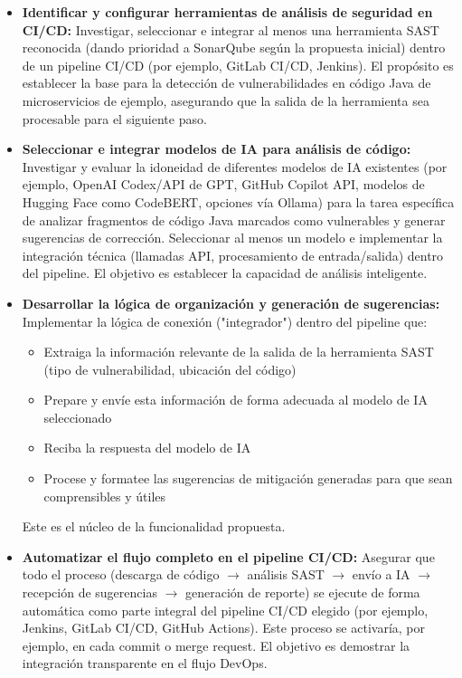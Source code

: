 \begin{itemize}
    \item \textbf{Identificar y configurar herramientas de análisis de seguridad en CI/CD:} Investigar, seleccionar e integrar al menos una herramienta SAST reconocida (dando prioridad a SonarQube según la propuesta inicial) dentro de un pipeline CI/CD (por ejemplo, GitLab CI/CD, Jenkins). El propósito es establecer la base para la detección de vulnerabilidades en código Java de microservicios de ejemplo, asegurando que la salida de la herramienta sea procesable para el siguiente paso.
    
    \item \textbf{Seleccionar e integrar modelos de IA para análisis de código:} Investigar y evaluar la idoneidad de diferentes modelos de IA existentes (por ejemplo, OpenAI Codex/API de GPT, GitHub Copilot API, modelos de Hugging Face como CodeBERT, opciones vía Ollama) para la tarea específica de analizar fragmentos de código Java marcados como vulnerables y generar sugerencias de corrección. Seleccionar al menos un modelo e implementar la integración técnica (llamadas API, procesamiento de entrada/salida) dentro del pipeline. El objetivo es establecer la capacidad de análisis inteligente.
    
    \item \textbf{Desarrollar la lógica de organización y generación de sugerencias:} Implementar la lógica de conexión ("integrador") dentro del pipeline que:
    \begin{itemize}
        \item Extraiga la información relevante de la salida de la herramienta SAST (tipo de vulnerabilidad, ubicación del código)
        \item Prepare y envíe esta información de forma adecuada al modelo de IA seleccionado
        \item Reciba la respuesta del modelo de IA
        \item Procese y formatee las sugerencias de mitigación generadas para que sean comprensibles y útiles
    \end{itemize}
    Este es el núcleo de la funcionalidad propuesta.
    
    \item \textbf{Automatizar el flujo completo en el pipeline CI/CD:} Asegurar que todo el proceso (descarga de código $\rightarrow$ análisis SAST $\rightarrow$ envío a IA $\rightarrow$ recepción de sugerencias $\rightarrow$ generación de reporte) se ejecute de forma automática como parte integral del pipeline CI/CD elegido (por ejemplo, Jenkins, GitLab CI/CD, GitHub Actions). Este proceso se activaría, por ejemplo, en cada commit o merge request. El objetivo es demostrar la integración transparente en el flujo DevOps.
    

\end{itemize}
